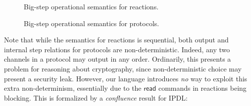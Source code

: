 \begin{figure}
\caption{Big-step operational semantics for \ipdl reactions.}
\label{fig:reactions_big_step}
\end{figure}

\begin{figure}
\caption{Big-step operational semantics for \ipdl protocols.}
\label{fig:protocols_big_step}
\end{figure}

Note that while the semantics for reactions is sequential, both output and internal step relations for protocols are non-deterministic. Indeed, any two channels in a protocol may output in any order. Ordinarily, this presents a problem for reasoning about cryptography, since non-deterministic choice may present a security leak. However, our language introduces \emph{no} way to exploit this extra non-determinism, essentially due to the $\mathsf{read}$ commands in reactions being blocking. This is formalized by a \emph{confluence} result for \textsf{IPDL}:

